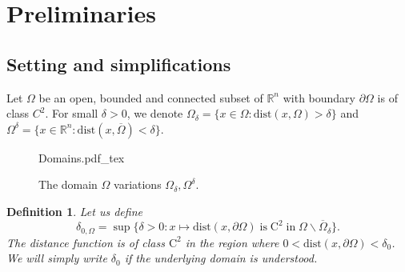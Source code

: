 \documentclass[11pt,reqno]{amsart}
\numberwithin{figure}{section}
\theoremstyle{plain}
\newtheorem{defn}{Definition}
\theoremstyle{remark}
\numberwithin{equation}{section}
\newcommand{\rmC}{\mathrm{C}}
\newcommand{\incfig}[1]{%
    \def\svgwidth{\columnwidth}
    {#1.pdf_tex}
}
\begin{document}

\section{Preliminaries}\label{sec:prelim} 
\subsection{Setting and simplifications} Let $\Omega$ be an open, bounded and connected subset of $\mathbb{R}^n$ with boundary $\partial\Omega$ is of class $C^2$. For small $\delta>0$, we denote $\Omega_\delta = \{x\in \Omega: \mathrm{dist}(x,\Omega) > \delta\}$ and $\Omega^\delta = \{x\in \mathbb{R}^n: \mathrm{dist}(x,\overline{\Omega}) < \delta\}$. 
\begin{figure}[ht]
    \centering
    \def\svgwidth{0.47\columnwidth}
    {Domains.pdf_tex}
    \caption{The domain $\Omega$ variations $\Omega_\delta, \Omega^\delta$.}
    \label{fig:Domains}
\end{figure}

\begin{defn} Let us define
\begin{equation}\label{def:delta_0}
    \delta_{0,\Omega} = \sup \big\{ \delta > 0: x\mapsto\mathrm{dist}(x,\partial\Omega)\;\text{is}\;\rmC^2\;\text{in}\;\Omega\backslash\overline{\Omega}_{\delta} \big\}.
\end{equation}
The distance function is of class $\mathrm{C}^2$ in the region where $0<\mathrm{dist}(x,\partial\Omega) < \delta_0$. We will simply write $\delta_0$ if the underlying domain is understood.
\end{defn}
\end{document}
